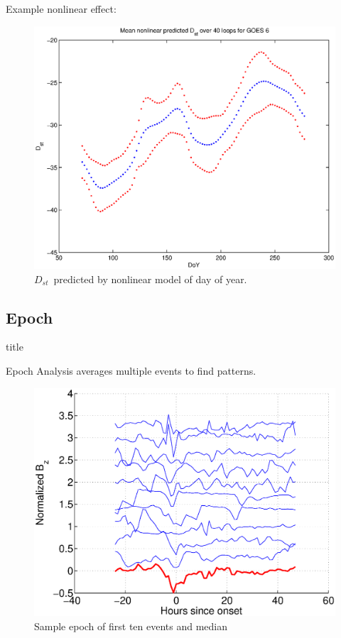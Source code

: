 \documentclass[xcolor={dvipsnames,table}]{beamer}
\newcommand{\subheader}{    		\begin{center}
  	\begin{beamercolorbox}[sep=4pt,center,shadow=true,rounded=true]{title}
  		\usebeamerfont{title}\subsecname\par%
  	\end{beamercolorbox}
  	\vfill
  	\end{center}}
\newcommand{\dst}{\ensuremath{D_{st}}} %
\begin{document}
\begin{frame}
	Example nonlinear effect:
	\begin{figure}[htp!]
		\centering
		\includegraphics[width=0.7\linewidth]{Figures/NNDoY-Dst-GOES6}	
		\caption{\dst\ predicted by nonlinear model of day of year.}
		\label{fig:DoYDst}
	\end{figure}
\end{frame}




\subsection{Epoch}
\begin{frame}
	\subheader
	Epoch Analysis averages multiple events to find patterns.
\begin{figure}
\includegraphics[scale=0.35]{Figures/epochexample}
\caption{Sample epoch of first ten events and median}
\label{fig:epochexample}
\end{figure}
\end{frame}
\end{document}
